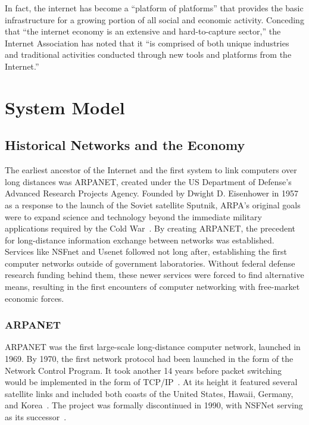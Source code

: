 \documentclass[journal]{IEEEtran}
\begin{document}
In fact, the internet has become a \enquote{platform of platforms} that provides the basic infrastructure for a growing portion of all social and economic activity. Conceding that \enquote{the internet economy is an extensive and hard-to-capture sector,} the Internet Association has noted that it \enquote{is comprised of both unique industries and traditional activities conducted through new tools and platforms from the Internet.}

\section{System Model}

\subsection{Historical Networks and the Economy}
The earliest ancestor of the Internet and the first system to link computers over long distances was ARPANET, created under the US Department of Defense's Advanced Research Projects Agency. Founded by Dwight D. Eisenhower in 1957 as a response to the launch of the Soviet satellite Sputnik, ARPA's original goals were to expand science and technology beyond the immediate military applications required by the Cold War~\cite{eisenhowerarpa}. By creating ARPANET, the precedent for long-distance information exchange between networks was established. Services like NSFnet and Usenet followed not long after, establishing the first computer networks outside of government laboratories. Without federal defense research funding behind them, these newer services were forced to find alternative means, resulting in the first encounters of computer networking with free-market economic forces.

\subsubsection{ARPANET}
ARPANET was the first large-scale long-distance computer network, launched in 1969. By 1970, the first network protocol had been launched in the form of the Network Control Program.  It took another 14 years before packet switching would be implemented in the form of TCP/IP~\cite{arpanetswitch}. At its height it featured several satellite links and included both coasts of the United States, Hawaii, Germany, and Korea~\cite{meineldigitalcomms}. The project was formally discontinued in 1990, with NSFNet serving as its successor~\cite{nsfnet}.
\end{document}
